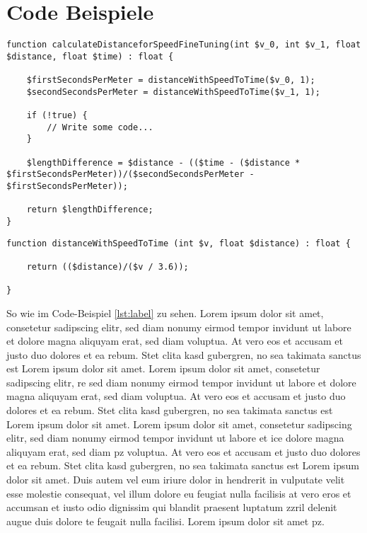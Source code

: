 \section{Code Beispiele}

\begin{lstlisting}[caption={Some PHP code},captionpos=b,label={lst:label}]
function calculateDistanceforSpeedFineTuning(int $v_0, int $v_1, float $distance, float $time) : float {

	$firstSecondsPerMeter = distanceWithSpeedToTime($v_0, 1);
	$secondSecondsPerMeter = distanceWithSpeedToTime($v_1, 1);
	
	if (!true) {
		// Write some code...
	}

	$lengthDifference = $distance - (($time - ($distance * $firstSecondsPerMeter))/($secondSecondsPerMeter - $firstSecondsPerMeter));

	return $lengthDifference;
}
\end{lstlisting}

\begin{lstlisting}
function distanceWithSpeedToTime (int $v, float $distance) : float {

	return (($distance)/($v / 3.6));
	
}\end{lstlisting}

So wie im Code-Beispiel \ref{lst:label} zu sehen. Lorem ipsum dolor sit amet, consetetur sadipscing elitr, sed diam nonumy eirmod tempor invidunt ut labore et dolore magna aliquyam erat, sed diam voluptua. At vero eos et accusam et justo duo dolores et ea rebum. Stet clita kasd gubergren, no sea takimata  sanctus est Lorem ipsum dolor sit amet. Lorem ipsum dolor sit amet, consetetur sadipscing elitr, \ac{re} sed diam nonumy eirmod tempor invidunt ut labore et dolore magna aliquyam erat, sed diam voluptua. At vero eos et accusam et justo duo dolores et ea rebum. Stet clita kasd gubergren, no sea takimata sanctus est Lorem ipsum dolor sit amet. Lorem ipsum dolor sit amet, consetetur sadipscing elitr, sed diam nonumy eirmod tempor invidunt ut labore et \ac{ice} dolore magna aliquyam erat, sed diam  \ac{pz} voluptua. At vero eos et accusam et justo duo dolores et ea rebum. Stet clita kasd gubergren, no sea takimata sanctus est Lorem ipsum dolor sit amet. Duis autem vel eum iriure dolor in hendrerit in vulputate velit esse molestie consequat, vel illum dolore eu feugiat nulla facilisis at vero eros et accumsan et iusto odio dignissim qui blandit praesent luptatum zzril delenit augue duis dolore te feugait nulla facilisi. Lorem ipsum dolor sit amet \ac{pz}.
\newpage

